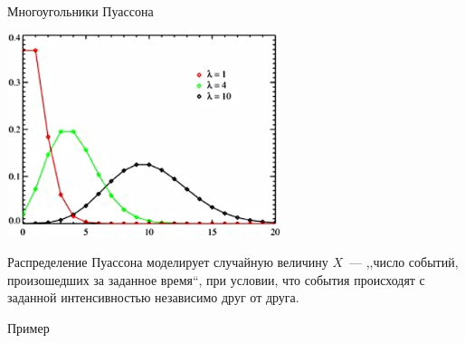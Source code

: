 \documentclass[unicode,11pt,notheorems,xcolor=table]{beamer}
\begin{document}
\begin{frame}{Многоугольники Пуассона}{}

  
    
    {\centering \includegraphics[width=8cm]{puasson.png}\par}

    Распределение Пуассона моделирует случайную величину $X$~--- ,,число событий, произошедших за заданное время``, при условии, что события происходят с заданной интенсивностью независимо друг от друга.
    
\end{frame}

\begin{frame}{Пример}{}

\end{frame}
\end{document}
